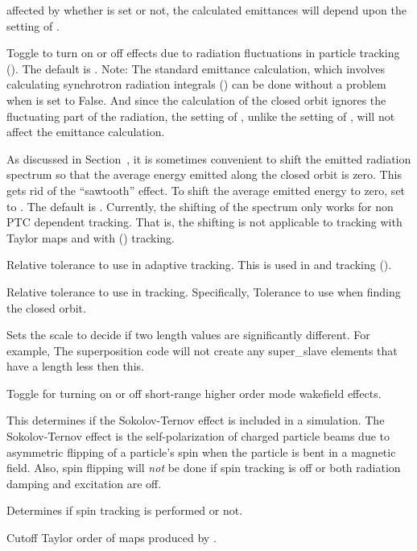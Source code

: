 {\begin{description}
affected by whether  is set or not, the calculated emittances will depend
upon the setting of .
%
\item[\vn{radiation_fluctuations_on}] \Newline
Toggle to turn on or off effects due to radiation fluctuations in particle tracking
().  The default is . Note: The standard \bmad emittance calculation,
which involves calculating synchrotron radiation integrals () can be done without
a problem when  is set to False. And since the calculation of the closed orbit
ignores the fluctuating part of the radiation, the setting of , unlike the
setting of , will not affect the emittance calculation.
%
\item[\vn{radiation_zero_average}] \Newline
As discussed in Section~, it is sometimes convenient to shift the emitted radiation
spectrum so that the average energy emitted along the closed orbit is zero. This gets rid of the ``sawtooth''
effect. To shift the average emitted energy to zero, set  to . The
default is . Currently, the shifting of the spectrum only works for non PTC
dependent tracking. That is, the shifting is not applicable to tracking with Taylor maps and with
 () tracking.
%
\item[\vn{rel_tol_adaptive_tracking}] \Newline
Relative tolerance to use in adaptive tracking. This is used in  and
 tracking ().
%
\item[\vn{rel_tol_tracking}] \Newline
Relative tolerance to use in tracking. Specifically, Tolerance to use when finding the closed orbit.
%
\item[\vn{significant_length}] \Newline
Sets the scale to decide if two length values are significantly different. For example, The
superposition code will not create any super_slave elements that have a length less then this.
%
\item[\vn{sr_wakes_on}] \Newline
Toggle for turning on or off short-range higher order mode wakefield effects.
%
\item[\vn{spin_sokolov_ternov_flipping_on}] \Newline
This determines if the Sokolov-Ternov effect is included in a simulation.  The Sokolov-Ternov
effect\cite{b:barber99} is the self-polarization of charged particle beams due to asymmetric flipping
of a particle's spin when the particle is bent in a magnetic field. Also, spin flipping will {\em
not} be done if spin tracking is off or both radiation damping and excitation are off.
%
\item[\vn{spin_tracking_on}] \Newline
Determines if spin tracking is performed or not.
%
\item[\vn{taylor_order}] \Newline
Cutoff Taylor order of maps produced by .
\end{description}

}
